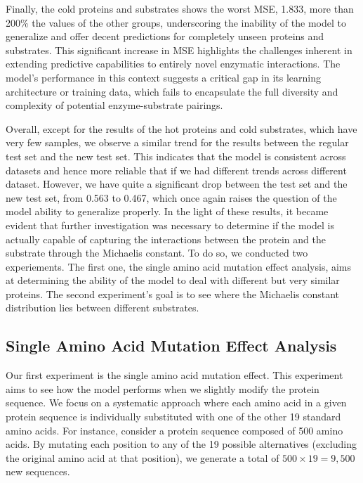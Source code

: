 Finally, the cold proteins and substrates shows the worst MSE, 1.833, more than 200\% the values of the other groups, underscoring the inability of the model to generalize and offer decent predictions for completely unseen proteins and substrates. This significant increase in MSE highlights the challenges inherent in extending predictive capabilities to entirely novel enzymatic interactions. The model's performance in this context suggests a critical gap in its learning architecture or training data, which fails to encapsulate the full diversity and complexity of potential enzyme-substrate pairings.

Overall, except for the results of the hot proteins and cold substrates, which have very few samples, we observe a similar trend for the results between the regular test set and the new test set. This indicates that the model is consistent across datasets and hence more reliable that if we had different trends across different dataset. However, we have quite a significant drop between the test set and the new test set, from 0.563 to 0.467, which once again raises the question of the model ability to generalize properly. In the light of these results, it became evident that further investigation was necessary to determine if the model is actually capable of capturing the interactions between the protein and the substrate through the Michaelis constant. To do so, we conducted two experiements. The first one, the single amino acid mutation effect analysis, aims at determining the ability of the model to deal with different but very similar proteins. The second experiment's goal is to see where the Michaelis constant distribution lies between different substrates.

\subsection{Single Amino Acid Mutation Effect Analysis}

Our first experiment is the single amino acid mutation effect. This experiment aims to see how the model
performs when we slightly modify the protein sequence. We focus on a systematic approach where each amino acid in a given protein sequence is individually substituted with one of the other 19 standard amino acids. For instance, consider a protein sequence composed of 500 amino acids. By mutating each position to any of the 19 possible alternatives (excluding the original amino acid at that position), we generate a total of  $500\times19=9,500$ new sequences.


